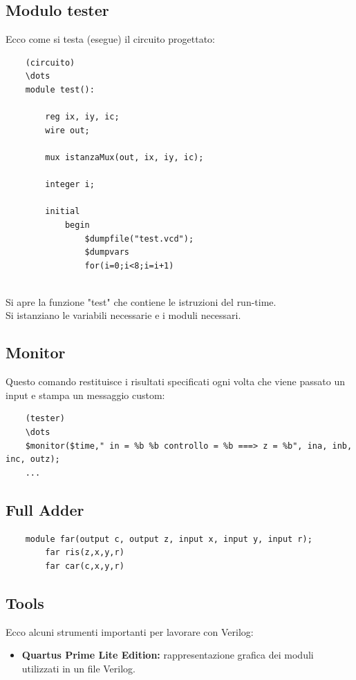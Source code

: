 \documentclass[12pt,a4paper]{article}
\begin{document}
\subsection{Modulo tester}
Ecco come si testa (esegue) il circuito progettato:
\begin{lstlisting}
    (circuito)
    \dots
    module test():

        reg ix, iy, ic;
        wire out;

        mux istanzaMux(out, ix, iy, ic);

        integer i;
        
        initial
            begin
                $dumpfile("test.vcd");
                $dumpvars
                for(i=0;i<8;i=i+1)


\end{lstlisting}
Si apre la funzione "test" che contiene le istruzioni del run-time.\\
Si istanziano le variabili necessarie e i moduli necessari.\\

\subsection{Monitor}
Questo comando restituisce i risultati specificati ogni volta che viene passato un input e stampa un messaggio custom:
\begin{lstlisting}
    (tester)
    \dots
    $monitor($time," in = %b %b controllo = %b ===> z = %b", ina, inb, inc, outz);
    ...
\end{lstlisting}

\subsection{Full Adder}
\begin{lstlisting}
    module far(output c, output z, input x, input y, input r);
        far ris(z,x,y,r)
        far car(c,x,y,r)

\end{lstlisting}

\subsection{Tools}
Ecco alcuni strumenti importanti per lavorare con Verilog:
\begin{itemize}
    \item \textbf{Quartus Prime Lite Edition:} rappresentazione grafica dei moduli utilizzati in un file Verilog.
\end{itemize}
\end{document}
